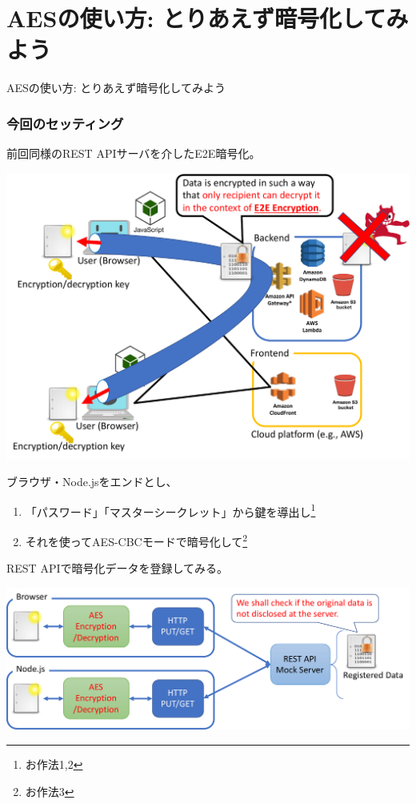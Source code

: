 \documentclass[12pt,dvipdfmx]{beamer}
\begin{document}
\section{AESの使い方: とりあえず暗号化してみよう}
\begin{frame}
\centering
{\Large AESの使い方: とりあえず暗号化してみよう}
\end{frame}

\begin{frame}
\frametitle{今回のセッティング}
前回同様のREST APIサーバを介したE2E暗号化。
\begin{center}
\includegraphics[width=0.9\linewidth]{Figs/e2e.pdf}
\end{center}
\end{frame}

\begin{frame}
ブラウザ・Node.jsをエンドとし、
\begin{enumerate}
 \item 「パスワード」「マスターシークレット」から鍵を導出し\footnote[frame]{お作法1,2}
 \item それを使ってAES-CBCモードで暗号化して\footnote[frame]{お作法3}
\end{enumerate}
REST APIで暗号化データを登録してみる。
\begin{center}
\includegraphics[width=\linewidth]{Figs/mock_flow.pdf}
\end{center}
\end{frame}
\end{document}
